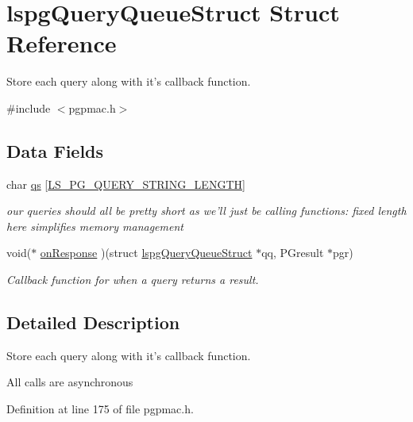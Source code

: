 \hypertarget{structlspgQueryQueueStruct}{\section{lspg\-Query\-Queue\-Struct Struct Reference}
\label{structlspgQueryQueueStruct}
}


Store each query along with it's callback function.  




{\ttfamily \#include $<$pgpmac.\-h$>$}

\subsection*{Data Fields}
\begin{DoxyCompactItemize}
\item 
char \hyperlink{structlspgQueryQueueStruct_abf8c9c581b38a5e3e269eda69e47de15}{qs} \mbox{[}\hyperlink{pgpmac_8h_a3a8ef1b4b5994d6dd12bf74454ea891b}{L\-S\-\_\-\-P\-G\-\_\-\-Q\-U\-E\-R\-Y\-\_\-\-S\-T\-R\-I\-N\-G\-\_\-\-L\-E\-N\-G\-T\-H}\mbox{]}
\begin{DoxyCompactList}\small\item\em our queries should all be pretty short as we'll just be calling functions\-: fixed length here simplifies memory management \end{DoxyCompactList}\item 
void($\ast$ \hyperlink{structlspgQueryQueueStruct_a53bac5ae4cab775423940bff5092a831}{on\-Response} )(struct \hyperlink{structlspgQueryQueueStruct}{lspg\-Query\-Queue\-Struct} $\ast$qq, P\-Gresult $\ast$pgr)
\begin{DoxyCompactList}\small\item\em Callback function for when a query returns a result. \end{DoxyCompactList}\end{DoxyCompactItemize}


\subsection{Detailed Description}
Store each query along with it's callback function. 

All calls are asynchronous 

Definition at line 175 of file pgpmac.\-h.



